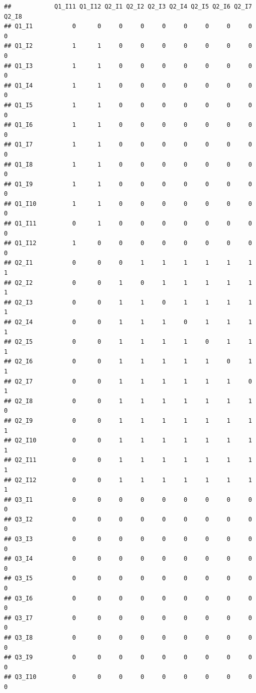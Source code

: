 \documentclass[]{book}
\begin{document}
\begin{verbatim}
##            Q1_I11 Q1_I12 Q2_I1 Q2_I2 Q2_I3 Q2_I4 Q2_I5 Q2_I6 Q2_I7 Q2_I8
## Q1_I1           0      0     0     0     0     0     0     0     0     0
## Q1_I2           1      1     0     0     0     0     0     0     0     0
## Q1_I3           1      1     0     0     0     0     0     0     0     0
## Q1_I4           1      1     0     0     0     0     0     0     0     0
## Q1_I5           1      1     0     0     0     0     0     0     0     0
## Q1_I6           1      1     0     0     0     0     0     0     0     0
## Q1_I7           1      1     0     0     0     0     0     0     0     0
## Q1_I8           1      1     0     0     0     0     0     0     0     0
## Q1_I9           1      1     0     0     0     0     0     0     0     0
## Q1_I10          1      1     0     0     0     0     0     0     0     0
## Q1_I11          0      1     0     0     0     0     0     0     0     0
## Q1_I12          1      0     0     0     0     0     0     0     0     0
## Q2_I1           0      0     0     1     1     1     1     1     1     1
## Q2_I2           0      0     1     0     1     1     1     1     1     1
## Q2_I3           0      0     1     1     0     1     1     1     1     1
## Q2_I4           0      0     1     1     1     0     1     1     1     1
## Q2_I5           0      0     1     1     1     1     0     1     1     1
## Q2_I6           0      0     1     1     1     1     1     0     1     1
## Q2_I7           0      0     1     1     1     1     1     1     0     1
## Q2_I8           0      0     1     1     1     1     1     1     1     0
## Q2_I9           0      0     1     1     1     1     1     1     1     1
## Q2_I10          0      0     1     1     1     1     1     1     1     1
## Q2_I11          0      0     1     1     1     1     1     1     1     1
## Q2_I12          0      0     1     1     1     1     1     1     1     1
## Q3_I1           0      0     0     0     0     0     0     0     0     0
## Q3_I2           0      0     0     0     0     0     0     0     0     0
## Q3_I3           0      0     0     0     0     0     0     0     0     0
## Q3_I4           0      0     0     0     0     0     0     0     0     0
## Q3_I5           0      0     0     0     0     0     0     0     0     0
## Q3_I6           0      0     0     0     0     0     0     0     0     0
## Q3_I7           0      0     0     0     0     0     0     0     0     0
## Q3_I8           0      0     0     0     0     0     0     0     0     0
## Q3_I9           0      0     0     0     0     0     0     0     0     0
## Q3_I10          0      0     0     0     0     0     0     0     0     0

\end{verbatim}
\end{document}
